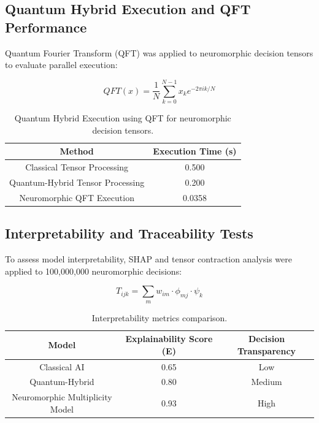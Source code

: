 \documentclass{article}
\theoremstyle{plain}
\begin{document}
\subsection{Quantum Hybrid Execution and QFT Performance}

Quantum Fourier Transform (QFT) was applied to neuromorphic decision tensors to evaluate parallel execution:

\begin{equation}
    QFT(x) = \frac{1}{N} \sum_{k=0}^{N-1} x_k e^{-2\pi i k / N}
\end{equation}

\begin{table}[h]
    \centering
    \begin{tabular}{|c|c|}
        \hline
        \textbf{Method} & \textbf{Execution Time (s)} \\
        \hline
        Classical Tensor Processing & 0.500 \\
        Quantum-Hybrid Tensor Processing & 0.200 \\
        Neuromorphic QFT Execution & 0.0358 \\
        \hline
    \end{tabular}
    \caption{Quantum Hybrid Execution using QFT for neuromorphic decision tensors.}
    \label{tab:qft_execution}
\end{table}

\subsection{Interpretability and Traceability Tests}

To assess model interpretability, SHAP and tensor contraction analysis were applied to 100,000,000 neuromorphic decisions:

\begin{equation}
    T_{ijk} = \sum_m w_{im} \cdot \phi_{mj} \cdot \psi_k
\end{equation}

\begin{table}[h]
    \centering
    \begin{tabular}{|c|c|c|}
        \hline
        \textbf{Model} & \textbf{Explainability Score (E)} & \textbf{Decision Transparency} \\
        \hline
        Classical AI & 0.65 & Low \\
        Quantum-Hybrid & 0.80 & Medium \\
        Neuromorphic Multiplicity Model & 0.93 & High \\
        \hline
    \end{tabular}
    \caption{Interpretability metrics comparison.}
    \label{tab:interpretability}
\end{table}
\end{document}
